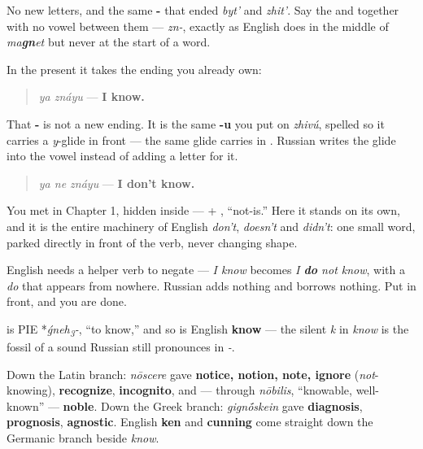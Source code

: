 No new letters, and the same \textbf{-} that ended \emph{byt'} and \emph{zhit'}. Say the \textbf{} and \textbf{} together with no vowel between them — \emph{zn-}, exactly as English does in the middle of \emph{ma\textbf{gn}et} but never at the start of a word.

In the present it takes the ending you already own:

\begin{quote}
\emph{ya znáyu} — \textbf{I know.}
\end{quote}

That \textbf{-} is not a new ending. It is the same \textbf{-u} you put on \emph{zhivú}, spelled so it carries a \emph{y}-glide in front — the same glide \textbf{} carries in \emph{}. Russian writes the glide into the vowel instead of adding a letter for it.

\begin{grammarlens}[title={Grammar Lens: \ru{не}, the whole of \textquotedblleft{}don't\textquotedblright{}}]
\begin{quote}
\emph{ya ne znáyu} — \textbf{I don't know.}
\end{quote}

You met \textbf{} in Chapter 1, hidden inside \textbf{} — \emph{} + \emph{}, \textquotedblleft{}not-is.\textquotedblright{} Here it stands on its own, and it is the entire machinery of English \emph{don't}, \emph{doesn't} and \emph{didn't}: one small word, parked directly in front of the verb, never changing shape.

English needs a helper verb to negate — \emph{I know} becomes \emph{I \textbf{do} not know}, with a \emph{do} that appears from nowhere. Russian adds nothing and borrows nothing. Put \textbf{} in front, and you are done.
\end{grammarlens}

\begin{cousinweb}
\textbf{} is PIE *\emph{ǵneh\textsubscript{3}-}, \textquotedblleft{}to know,\textquotedblright{} and so is English \textbf{know} — the silent \emph{k} in \emph{know} is the fossil of a sound Russian still pronounces in \emph{-}.

Down the Latin branch: \emph{nōscere} gave \textbf{notice, notion, note, ignore} (\emph{not}-knowing), \textbf{recognize}, \textbf{incognito}, and — through \emph{nōbilis}, \textquotedblleft{}knowable, well-known\textquotedblright{} — \textbf{noble}. Down the Greek branch: \emph{gign\'{\={o}}skein} gave \textbf{diagnosis}, \textbf{prognosis}, \textbf{agnostic}. English \textbf{ken} and \textbf{cunning} come straight down the Germanic branch beside \emph{know}.
\end{cousinweb}

